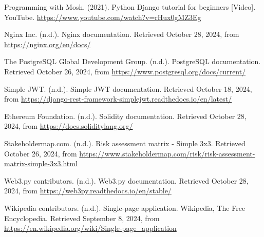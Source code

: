 \begin{thebibliography}{99}
Programming with Mosh. (2021). Python Django tutorial for beginners [Video]. YouTube. \url{https://www.youtube.com/watch?v=rHux0gMZ3Eg}

Nginx Inc. (n.d.). Nginx documentation. Retrieved October 28, 2024, from \url{https://nginx.org/en/docs/}

The PostgreSQL Global Development Group. (n.d.). PostgreSQL documentation. Retrieved October 26, 2024, from \url{https://www.postgresql.org/docs/current/}

Simple JWT. (n.d.). Simple JWT documentation. Retrieved October 18, 2024, from \url{https://django-rest-framework-simplejwt.readthedocs.io/en/latest/}

Ethereum Foundation. (n.d.). Solidity documentation. Retrieved October 28, 2024, from \url{https://docs.soliditylang.org/}

Stakeholdermap.com. (n.d.). Risk assessment matrix - Simple 3x3. Retrieved October 26, 2024, from \url{https://www.stakeholdermap.com/risk/risk-assessment-matrix-simple-3x3.html}

Web3.py contributors. (n.d.). Web3.py documentation. Retrieved October 28, 2024, from \url{https://web3py.readthedocs.io/en/stable/}

Wikipedia contributors. (n.d.). Single-page application. Wikipedia, The Free Encyclopedia. Retrieved September 8, 2024, from \url{https://en.wikipedia.org/wiki/Single-page_application}

\end{thebibliography}
